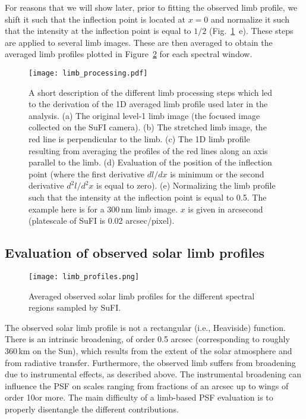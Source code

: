 \documentclass[goettingen, gauss, print]{thesis}
\begin{document}
For reasons that we will show later, prior to fitting the observed limb profile, we shift it such that the inflection point is located at $x=0$ and normalize it such that the intensity at the inflection point is equal to $1/2$ (Fig.~\ref{limb_process}~e). These steps are applied to several limb images. These are then averaged to obtain the averaged limb profiles plotted in Figure~\ref{av_limb_pro} for each spectral window.


\begin{figure}
\centering
\hspace*{-0.8cm}\texttt{[image: limb\_processing.pdf]}
\caption{A short description of the different limb processing steps which led to the derivation of the 1D averaged limb profile used later in the analysis. 
(a) The original level-1 limb image (the focused image collected on the SuFI camera). (b) The stretched limb image, the red line is perpendicular to the limb. (c) The 1D limb profile resulting from averaging the profiles of the red lines along an axis parallel to the limb. (d) Evaluation of the position of the inflection point (where the first derivative $dl/ dx$ is minimum or the second derivative $d^2l/ d^2x$ is equal to zero). (e) Normalizing the limb profile such that the intensity at the inflection point is equal to 0.5. The example here is for a 300\,nm limb image. $x$ is given in arcsecond (platescale of SuFI is 0.02 arcsec/pixel). }
\label{limb_process}
\end{figure}


\subsection{Evaluation of observed solar limb profiles} \label{sec:psf_limb}

\begin{figure}
\centering
\texttt{[image: limb\_profiles.png]}
\caption{Averaged observed solar limb profiles for the different spectral regions sampled by SuFI.}
\label{av_limb_pro}
\end{figure}


The observed solar limb profile is not a rectangular (i.e., Heaviside) function. There is an intrinsic broadening, of order 0.5 arcsec (corresponding to roughly 360\,km on the Sun), which results from the extent of the solar atmosphere and from radiative transfer. Furthermore, the observed limb suffers from broadening due to instrumental effects, as described above. The instrumental broadening can influence the PSF on scales ranging from fractions of an arcsec up to wings of order 10\arcsec or more. The main difficulty of a limb-based PSF evaluation is to properly disentangle the different contributions.
\end{document}

